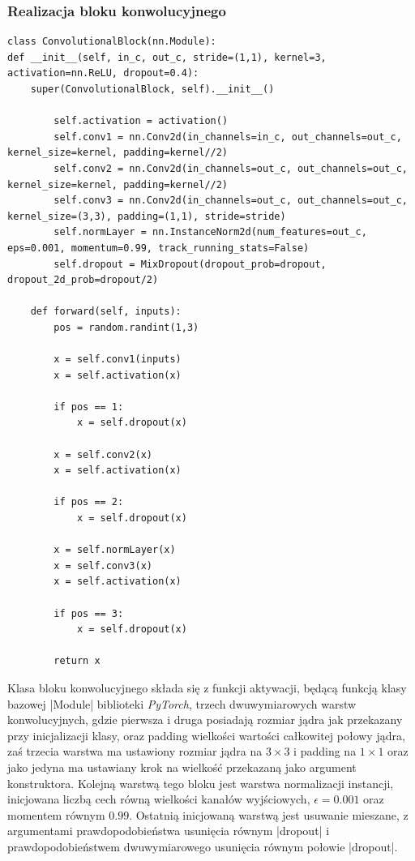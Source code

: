 \subsubsection{Realizacja bloku konwolucyjnego} \label{ConvBlock}
\begin{lstlisting}[caption={\pyth|ConvolutionalBlock| - klasa bloku konwolucyjnego.}, label={convblock}]
class ConvolutionalBlock(nn.Module):
def __init__(self, in_c, out_c, stride=(1,1), kernel=3, activation=nn.ReLU, dropout=0.4):
	super(ConvolutionalBlock, self).__init__()
	
		self.activation = activation()
		self.conv1 = nn.Conv2d(in_channels=in_c, out_channels=out_c, kernel_size=kernel, padding=kernel//2)
		self.conv2 = nn.Conv2d(in_channels=out_c, out_channels=out_c, kernel_size=kernel, padding=kernel//2)
		self.conv3 = nn.Conv2d(in_channels=out_c, out_channels=out_c, kernel_size=(3,3), padding=(1,1), stride=stride)
		self.normLayer = nn.InstanceNorm2d(num_features=out_c, eps=0.001, momentum=0.99, track_running_stats=False)
		self.dropout = MixDropout(dropout_prob=dropout, dropout_2d_prob=dropout/2)
	
	def forward(self, inputs):
		pos = random.randint(1,3)
		
		x = self.conv1(inputs)
		x = self.activation(x)
		
		if pos == 1:
			x = self.dropout(x)
		
		x = self.conv2(x)
		x = self.activation(x)
		
		if pos == 2:
			x = self.dropout(x)
		
		x = self.normLayer(x)
		x = self.conv3(x)
		x = self.activation(x)
		
		if pos == 3:
			x = self.dropout(x)
		
		return x
\end{lstlisting}

Klasa bloku konwolucyjnego składa się z funkcji aktywacji, będącą funkcją klasy bazowej \pyth|Module| biblioteki \textit{PyTorch}, trzech dwuwymiarowych warstw konwolucyjnych, gdzie pierwsza i druga posiadają rozmiar jądra jak przekazany przy inicjalizacji klasy, oraz padding wielkości wartości całkowitej połowy jądra, zaś trzecia warstwa ma ustawiony rozmiar jądra na $3\times 3$ i padding na $1 \times 1$ oraz jako jedyna ma ustawiany krok na wielkość przekazaną jako argument konstruktora. Kolejną warstwą tego bloku jest warstwa normalizacji instancji, inicjowana liczbą cech równą wielkości kanałów wyjściowych, $\epsilon = 0.001$ oraz momentem równym $0.99$. Ostatnią inicjowaną warstwą jest usuwanie mieszane, z argumentami prawdopodobieństwa usunięcia równym \pyth|dropout| i prawdopodobieństwem dwuwymiarowego usunięcia równym połowie \pyth|dropout|.

